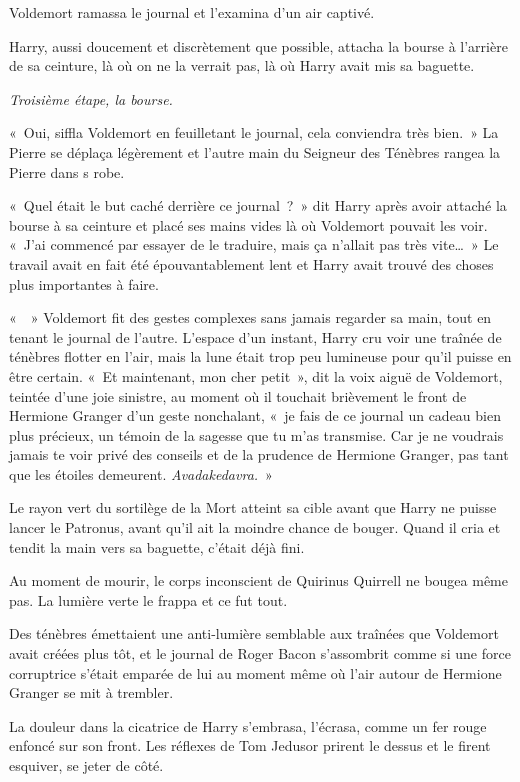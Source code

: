 Voldemort ramassa le journal et l'examina d'un air captivé.

Harry, aussi doucement et discrètement que possible, attacha la bourse à l'arrière de sa ceinture, là où on ne la verrait pas, là où Harry avait mis sa baguette.

\emph{Troisième étape, la bourse.}

«~Oui, siffla Voldemort en feuilletant le journal, cela conviendra très bien.~»
La Pierre se déplaça légèrement et l'autre main du Seigneur des Ténèbres rangea la Pierre dans s robe.

«~Quel était le but caché derrière ce journal~?~»
dit Harry après avoir attaché la bourse à sa ceinture et placé ses mains vides là où Voldemort pouvait les voir.
«~J'ai commencé par essayer de le traduire, mais ça n'allait pas très vite…~»
Le travail avait en fait été épouvantablement lent et Harry avait trouvé des choses plus importantes à faire.

«~~» Voldemort fit des gestes complexes sans jamais regarder sa main, tout en tenant le journal de l'autre.
L'espace d'un instant, Harry cru voir une traînée de ténèbres flotter en l'air, mais la lune était trop peu lumineuse pour qu'il puisse en être certain.
«~Et maintenant, mon cher petit~», dit la voix aiguë de Voldemort, teintée d'une joie sinistre, au moment où il touchait brièvement le front de Hermione Granger d'un geste nonchalant, «~je fais de ce journal un cadeau bien plus précieux, un témoin de la sagesse que tu m'as transmise.
Car je ne voudrais jamais te voir privé des conseils et de la prudence de Hermione Granger, pas tant que les étoiles demeurent.
\emph{Avadakedavra.}~»

Le rayon vert du sortilège de la Mort atteint sa cible avant que Harry ne puisse lancer le Patronus, avant qu'il ait la moindre chance de bouger.
Quand il cria et tendit la main vers sa baguette, c'était déjà fini.

Au moment de mourir, le corps inconscient de Quirinus Quirrell ne bougea même pas.
La lumière verte le frappa et ce fut tout.

Des ténèbres émettaient une anti-lumière semblable aux traînées que Voldemort avait créées plus tôt, et le journal de Roger Bacon s'assombrit comme si une force corruptrice s'était emparée de lui au moment même où l'air autour de Hermione Granger se mit à trembler.

La douleur dans la cicatrice de Harry s'embrasa, l'écrasa, comme un fer rouge enfoncé sur son front.
Les réflexes de Tom Jedusor prirent le dessus et le firent esquiver, se jeter de côté.

